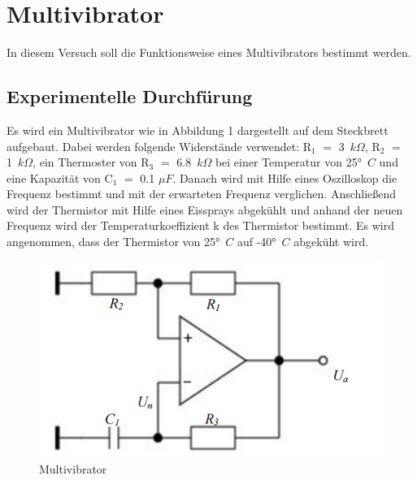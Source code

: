 \section{Multivibrator}
In diesem Versuch soll die Funktionsweise eines Multivibrators  bestimmt werden.
\subsection{Experimentelle Durchf\"urung}
Es wird ein Multivibrator wie in Abbildung 1 dargestellt auf dem Steckbrett aufgebaut. Dabei werden folgende Widerst\"ande verwendet: R$_1$  $=$ 3~$k\Omega$, R$_2$ $=$ 1~$k\Omega$, ein Thermoster von R$_3$ $=$ 6.8~$k\Omega$ bei einer Temperatur von 25$°$~$C$ und eine Kapazit\"at von C$_1$ $=$ 0.1 $\mu F$. Danach wird mit Hilfe eines Oszilloskop die Frequenz bestimmt und mit der erwarteten Frequenz verglichen. Anschlie\ss end wird der Thermistor mit Hilfe eines Eissprays abgek\"uhlt und anhand der neuen Frequenz wird der Temperaturkoeffizient k des Thermistor bestimmt. Es wird angenommen, dass der Thermistor von 25$°$~$C$ auf -40$°$~$C$ abgek\"uht wird.
\begin{figure}[!ht]
\begin{center}
\includegraphics[scale=0.7]{bild/Multivibrator}
\caption{Multivibrator}
\end{center}
\end{figure}

